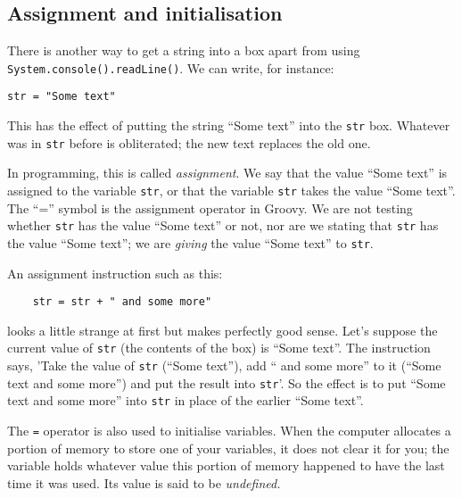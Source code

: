 
\subsection{Assignment and initialisation}

There is another way to get a string into a box apart from using
\verb!System.console().readLine()!.  We can write, for instance:

\begin{Verbatim}
str = "Some text"
\end{Verbatim}

This has the effect of putting the string ``Some text'' into the
\verb!str! box.  Whatever was in \verb!str! before is obliterated; the
new text replaces the old one. 

In programming, this is called \emph{assignment}.  We say that the
value ``Some text'' is
assigned to the variable \verb!str!, or that the variable \verb!str! takes the
value ``Some text''.  The ``='' symbol is the assignment operator in Groovy.  We are not
testing whether \verb!str! has the value ``Some text'' or not, nor are we stating that
\verb!str! has the value ``Some text''; we are \emph{giving} the value
``Some text'' to \verb!str!.

%

An assignment instruction such as this:

\begin{Verbatim}
    str = str + " and some more"
\end{Verbatim}

looks a little strange at first but makes perfectly good sense.
Let's suppose the current value of \verb!str! (the contents of the
box) is ``Some text''.
The instruction says, 'Take the value of \verb!str!
(``Some text''), add `` and some more''  to it (``Some text and some
more'') 
and put the result into \verb!str!'.
So the effect is to put ``Some text and some more'' into \verb!str! in
place of the earlier ``Some text''.

The \verb!=! operator is also used to initialise variables.  When the computer
allocates a portion of memory to store one of your variables, it does not
clear it for you; the variable holds whatever value this portion of memory
happened to have the last time it was used.  Its value is said to be
\emph{undefined.}

